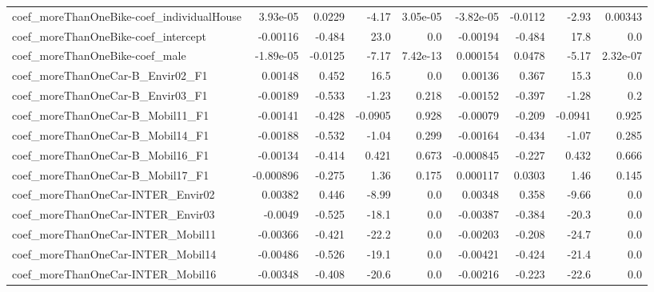 \begin{tabular}{lrrrrrrrr}
coef\_moreThanOneBike-coef\_individualHouse &    3.93e-05 &       0.0229 &   -4.17 & 3.05e-05 &  -3.82e-05 &     -0.0112 &        -2.93 &       0.00343 \\
coef\_moreThanOneBike-coef\_intercept       &    -0.00116 &       -0.484 &    23.0 &      0.0 &   -0.00194 &      -0.484 &         17.8 &           0.0 \\
coef\_moreThanOneBike-coef\_male            &   -1.89e-05 &      -0.0125 &   -7.17 & 7.42e-13 &   0.000154 &      0.0478 &        -5.17 &      2.32e-07 \\
coef\_moreThanOneCar-B\_Envir02\_F1          &     0.00148 &        0.452 &    16.5 &      0.0 &    0.00136 &       0.367 &         15.3 &           0.0 \\
coef\_moreThanOneCar-B\_Envir03\_F1          &    -0.00189 &       -0.533 &   -1.23 &    0.218 &   -0.00152 &      -0.397 &        -1.28 &           0.2 \\
coef\_moreThanOneCar-B\_Mobil11\_F1          &    -0.00141 &       -0.428 & -0.0905 &    0.928 &   -0.00079 &      -0.209 &      -0.0941 &         0.925 \\
coef\_moreThanOneCar-B\_Mobil14\_F1          &    -0.00188 &       -0.532 &   -1.04 &    0.299 &   -0.00164 &      -0.434 &        -1.07 &         0.285 \\
coef\_moreThanOneCar-B\_Mobil16\_F1          &    -0.00134 &       -0.414 &   0.421 &    0.673 &  -0.000845 &      -0.227 &        0.432 &         0.666 \\
coef\_moreThanOneCar-B\_Mobil17\_F1          &   -0.000896 &       -0.275 &    1.36 &    0.175 &   0.000117 &      0.0303 &         1.46 &         0.145 \\
coef\_moreThanOneCar-INTER\_Envir02         &     0.00382 &        0.446 &   -8.99 &      0.0 &    0.00348 &       0.358 &        -9.66 &           0.0 \\
coef\_moreThanOneCar-INTER\_Envir03         &     -0.0049 &       -0.525 &   -18.1 &      0.0 &   -0.00387 &      -0.384 &        -20.3 &           0.0 \\
coef\_moreThanOneCar-INTER\_Mobil11         &    -0.00366 &       -0.421 &   -22.2 &      0.0 &   -0.00203 &      -0.208 &        -24.7 &           0.0 \\
coef\_moreThanOneCar-INTER\_Mobil14         &    -0.00486 &       -0.526 &   -19.1 &      0.0 &   -0.00421 &      -0.424 &        -21.4 &           0.0 \\
coef\_moreThanOneCar-INTER\_Mobil16         &    -0.00348 &       -0.408 &   -20.6 &      0.0 &   -0.00216 &      -0.223 &        -22.6 &           0.0 \\

\end{tabular}
